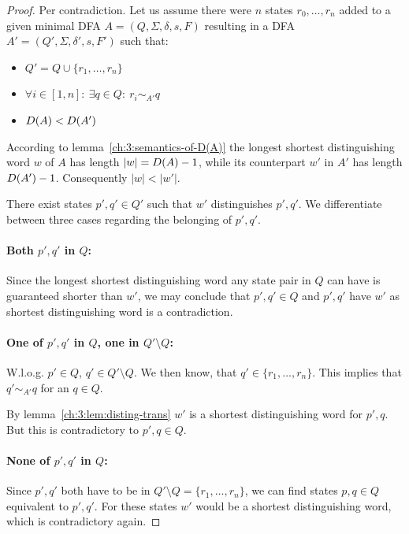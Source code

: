 \begin{proof}
	Per contradiction. Let us assume there were $n$ states $r_0, \ldots, r_n$ added to a given minimal DFA $A = (Q, \Sigma, \delta, s, F)$ resulting in a DFA $A' = (Q', \Sigma, \delta', s, F')$ such that:
	\begin{itemize}
		\item $Q' = Q \cup \{ r_1, \ldots, r_n \}$
		\item $\forall i \in [1,n] \colon\ \exists q \in Q\colon\ r_i \sim_{A'} q$
        \item $D(A) < D(A')$
	\end{itemize}
    According to lemma~\ref{ch:3:semantics-of-D(A)} the longest shortest distinguishing word $w$ of $A$ has length $|w| = D(A) - 1$, while its counterpart $w'$ in $A'$ has length $D(A') - 1$. Consequently $|w| < |w'|$.
    
    There exist states $p',q' \in Q'$ such that $w'$ distinguishes $p',q'$. We differentiate between three cases regarding the belonging of $p',q'$.
    
    \paragraph*{Both $p',q'$ in $Q$:} Since the longest shortest distinguishing word any state pair in $Q$ can have is guaranteed shorter than $w'$, we may conclude that $p',q' \in Q$ and $p',q'$ have $w'$ as shortest distinguishing word is a contradiction. \lightning
    
    \paragraph*{One of $p',q'$ in $Q$, one in $Q'\setminus Q$:} W.l.o.g. $p' \in Q$, $q' \in Q'\setminus Q$. We then know, that $q' \in \{r_1, \ldots, r_n\}$. This implies that $q' \sim_{A'} q$ for an $q \in Q$.
    
    By lemma~\ref{ch:3:lem:disting-trans} $w'$ is a shortest distinguishing word for $p',q$. But this is contradictory to $p',q \in Q$. \lightning
        
    \paragraph*{None of $p',q'$ in $Q$:} Since $p',q'$ both have to be in $Q'\setminus Q = \{r_1, \ldots, r_n\}$, we can find states $p, q \in Q$ equivalent to $p',q'$. For these states $w'$ would be a shortest distinguishing word, which is contradictory again. \lightning 
\end{proof}

